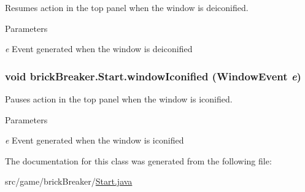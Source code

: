 \label{classbrick_breaker_1_1_start_a7a77b64bcea5b507ae49463baa3f0282}
Resumes action in the top panel when the window is deiconified. 
\begin{DoxyParams}{Parameters}
\item[{\em e}]Event generated when the window is deiconified \end{DoxyParams}
\hypertarget{classbrick_breaker_1_1_start_aaadc30e22fd645a756381bedd0c35c9e}{
\subsubsection[{windowIconified}]{\setlength{\rightskip}{0pt plus 5cm}void brickBreaker.Start.windowIconified (WindowEvent {\em e})}}
\label{classbrick_breaker_1_1_start_aaadc30e22fd645a756381bedd0c35c9e}
Pauses action in the top panel when the window is iconified. 
\begin{DoxyParams}{Parameters}
\item[{\em e}]Event generated when the window is iconified \end{DoxyParams}


The documentation for this class was generated from the following file:\begin{DoxyCompactItemize}
\item 
src/game/brickBreaker/\hyperlink{_start_8java}{Start.java}\end{DoxyCompactItemize}
